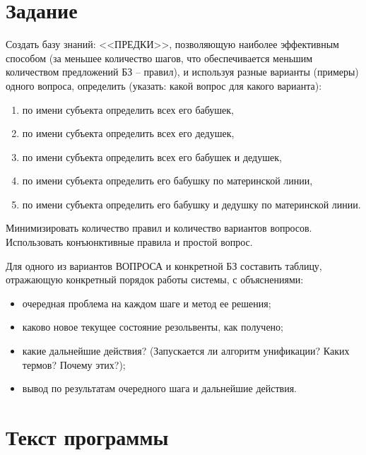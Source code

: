 {\large\section*{Задание}}

Создать базу знаний: <<ПРЕДКИ>>, позволяющую наиболее эффективным способом (за меньшее количество шагов, что обеспечивается меньшим количеством предложений БЗ -- правил), и используя разные варианты (примеры) одного вопроса, определить (указать: какой вопрос для какого варианта):

\begin{enumerate}[1.]
	\item по имени субъекта определить всех его бабушек,
	\item по имени субъекта определить всех его дедушек,
	\item по имени субъекта определить всех его бабушек и дедушек,
	\item по имени субъекта определить его бабушку по материнской линии,
	\item по имени субъекта определить его бабушку и дедушку по материнской линии.
\end{enumerate}

Минимизировать количество правил и количество вариантов вопросов. Использовать конъюнктивные правила и простой вопрос.

Для одного из вариантов ВОПРОСА и конкретной БЗ составить таблицу, отражающую конкретный порядок работы системы, с объяснениями:

\begin{itemize}[$\bullet$]
	\item очередная проблема на каждом шаге и метод ее решения;
	\item каково новое текущее состояние резольвенты, как получено;
	\item какие дальнейшие действия? (Запускается ли алгоритм унификации? Каких термов? Почему этих?);
	\item вывод по результатам очередного шага и дальнейшие действия.
\end{itemize}

\clearpage

{\large\section*{Текст программы}}


